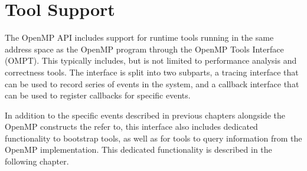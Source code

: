 %
%
%
%
%
%
%
%
%
%


\chapter{Tool Support}
\label{chap:ToolsSupport}

The OpenMP API includes support for
runtime tools running in the same
address space as the OpenMP program through the OpenMP Tools Interface (OMPT).
This typically includes, but is not limited to performance analysis and correctness tools.
The interface is split into two subparts, a tracing interface that can be used to record
series of events in the system, and a callback interface that can be used to register
callbacks for specific events.

In addition to the specific events described in previous chapters alongside the OpenMP
constructs the refer to, this interface also includes dedicated functionality to bootstrap
tools, as well as for tools to query information from the OpenMP implementation. This
dedicated functionality is described in the following chapter.

